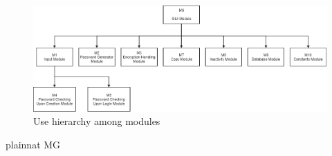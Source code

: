 \documentclass[12pt, titlepage]{article}
\begin{document}
\begin{figure}[H]
\centering
\includegraphics[scale=0.5]{Images/DAG.png}
\caption{Use hierarchy among modules}
\label{FigUH}
\end{figure}


 {plainnat}
 {MG}
\end{document}
